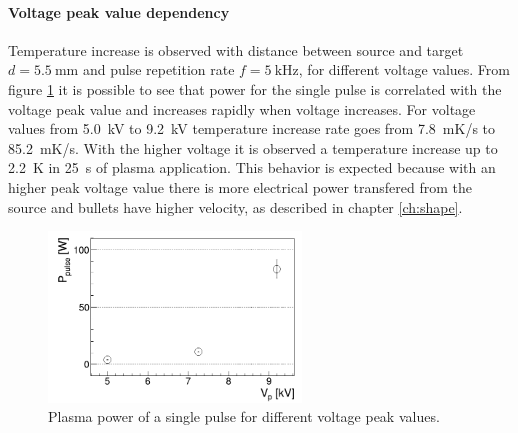 \paragraph{Voltage peak value dependency}
Temperature increase is observed with distance between source and target $d = \SI{5.5}{\milli\meter}$ and pulse repetition rate $f = \SI{5}{\kilo\hertz}$, for different voltage values. From figure \ref{fig:PVp} it is possible to see that power for the single pulse is correlated with the voltage peak value and increases rapidly when voltage increases. For voltage values from \SI{5.0}{\kilo\volt} to \SI{9.2}{\kilo\volt} temperature increase rate goes from \SI{7.8}{\milli\kelvin/\second} to \SI{85.2}{\milli\kelvin/\second}. With the higher voltage it is observed a temperature increase up to \SI{2.2}{\kelvin} in \SI{25}{\second} of plasma application. This behavior is expected because with an higher peak voltage value there is more electrical power transfered from the source and bullets have higher velocity, as described in chapter \ref{ch:shape}.
\begin{figure}
 \centering
 \includegraphics[width=0.6\textwidth]{Images/Temperature/Ppulse_Vp_2.png}
 \caption{Plasma power of a single pulse for different voltage peak values.}
 \label{fig:PVp}
\end{figure}


